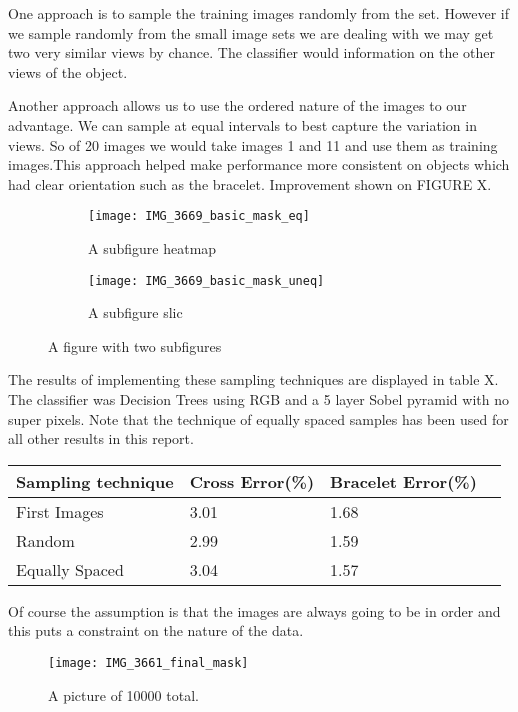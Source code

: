 \documentclass[12pt]{IIBproject}
\begin{document}
One approach is to sample the training images randomly from the set. However if we sample randomly from the small image sets we are dealing with we may get two very similar views by chance. The classifier would information on the other views of the object. 

Another approach allows us to use the ordered nature of the images to our advantage. We can sample at equal intervals to best capture the variation in views. So of 20 images we would take images 1 and 11 and use them as training images.This approach helped make performance more consistent on objects which had clear orientation such as the bracelet. Improvement shown on FIGURE X.
\begin{figure}[H]
\centering
\begin{subfigure}{.5\textwidth}
  \centering
  \texttt{[image: IMG\_3669\_basic\_mask\_eq]}
  \caption{A subfigure heatmap}
  \label{fig:sub2}
\end{subfigure}
\begin{subfigure}{.5\textwidth}
  \centering
  \texttt{[image: IMG\_3669\_basic\_mask\_uneq]}
  \caption{A subfigure slic}
  \label{fig:sub1}
\end{subfigure}%


\caption{A figure with two subfigures}
\label{fig:test}
\end{figure}

The results of implementing these sampling techniques are displayed in table X. The classifier was Decision Trees using RGB and a 5 layer Sobel pyramid with no super pixels. Note that the technique of equally spaced samples has been used for all other results in this report.
\begin{center}
    \begin{tabular}{ | l | l | l | p{5cm} |}
    \hline
    Sampling technique & Cross Error(\%) & Bracelet Error(\%) \\ \hline
    First Images & 3.01 & 1.68 \\ \hline
    Random & 2.99 & 1.59 \\
    \hline
    Equally Spaced & 3.04 & 1.57 \\
    \hline
    \end{tabular}
    
\end{center}
 Of course the assumption is that the images are always going to be in order and this puts a constraint on the nature of the data.

\begin{figure}[H]
  \caption{A picture of 10000 total.}
  \centering
    \texttt{[image: IMG\_3661\_final\_mask]}
\end{figure}
\end{document}
